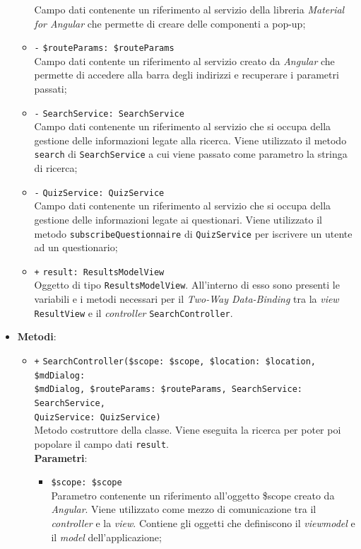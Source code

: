 \begin{itemize}
\begin{itemize}
		Campo dati contenente un riferimento al servizio della libreria \textit{Material for Angular} che permette di creare delle componenti a pop-up;
		\item \texttt{-} \texttt{\$routeParams: \$routeParams} \\
		Campo dati contente un riferimento al servizio creato da \textit{Angular} che permette di accedere alla barra degli indirizzi e recuperare i parametri passati; 
		\item \texttt{-} \texttt{SearchService: SearchService} \\
		Campo dati contenente un riferimento al servizio che si occupa della gestione delle informazioni legate alla ricerca. Viene utilizzato il metodo \texttt{search} di \texttt{SearchService} a cui viene passato come parametro la stringa di ricerca;
		\item \texttt{-} \texttt{QuizService: QuizService} \\
		Campo dati contenente un riferimento al servizio che si occupa della gestione delle informazioni legate ai questionari. Viene utilizzato il metodo \texttt{subscribeQuestionnaire} di \texttt{QuizService} per iscrivere un utente ad un questionario;
		\item \texttt{+} \texttt{result: ResultsModelView} \\
		Oggetto di tipo \texttt{ResultsModelView}. All'interno di esso sono presenti le variabili e i metodi necessari per il \textit{Two-Way Data-Binding} tra la \textit{view} \texttt{ResultView} e il \textit{controller} \texttt{SearchController}.
	\end{itemize}
	\item \textbf{Metodi}:
	\begin{itemize}
		\item \texttt{+} \texttt{SearchController(\$scope: \$scope, \$location: \$location, \$mdDialog:\\ \$mdDialog, \$routeParams: \$routeParams, SearchService: SearchService,\\ QuizService: QuizService)} \\
		Metodo costruttore della classe. Viene eseguita la ricerca per poter poi popolare il campo dati \texttt{result}. \\
		\textbf{Parametri}:
		\begin{itemize}
			\item \texttt{\$scope: \$scope} \\
			Parametro contenente un riferimento all'oggetto \$scope creato da \textit{Angular}. Viene utilizzato come mezzo di comunicazione tra il \textit{controller} e la \textit{view}. Contiene gli oggetti che definiscono il \textit{viewmodel} e il \textit{model} dell'applicazione;

\end{itemize}
\end{itemize}
\end{itemize}
